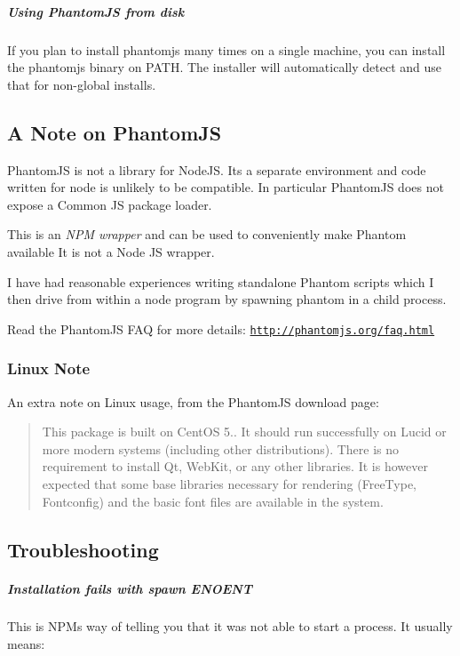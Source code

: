 \subparagraph*{Using Phantom\+J\+S from disk}

If you plan to install phantomjs many times on a single machine, you can install the {\ttfamily phantomjs} binary on P\+A\+T\+H. The installer will automatically detect and use that for non-\/global installs.

\subsection*{A Note on Phantom\+J\+S }

Phantom\+J\+S is not a library for Node\+J\+S. It\textquotesingle{}s a separate environment and code written for node is unlikely to be compatible. In particular Phantom\+J\+S does not expose a Common J\+S package loader.

This is an {\itshape N\+P\+M wrapper} and can be used to conveniently make Phantom available It is not a Node J\+S wrapper.

I have had reasonable experiences writing standalone Phantom scripts which I then drive from within a node program by spawning phantom in a child process.

Read the Phantom\+J\+S F\+A\+Q for more details\+: \href{http://phantomjs.org/faq.html}{\tt http\+://phantomjs.\+org/faq.\+html}

\subsubsection*{Linux Note}

An extra note on Linux usage, from the Phantom\+J\+S download page\+:

\begin{quote}
This package is built on Cent\+O\+S 5.. It should run successfully on Lucid or more modern systems (including other distributions). There is no requirement to install Qt, Web\+Kit, or any other libraries. It is however expected that some base libraries necessary for rendering (Free\+Type, Fontconfig) and the basic font files are available in the system. \end{quote}


\subsection*{Troubleshooting }

\subparagraph*{Installation fails with {\ttfamily spawn E\+N\+O\+E\+N\+T}}

This is N\+P\+M\textquotesingle{}s way of telling you that it was not able to start a process. It usually means\+:


